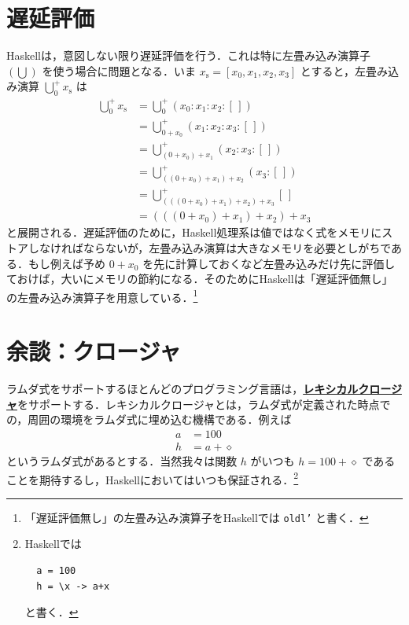 \documentclass[a5paper,twoside,fleqn,draft]{jsbook}
\newcommand{\programminglanguage}[1]{\textsf{#1}}
\newcommand{\haskell}{\programminglanguage{Haskell}}
\newcommand{\keyword}[1]{{\underline{\textbf{#1}}}}
\newcommand{\code}[1]{\texttt{#1}}
\newcommand{\mEmptyList}{{[\,]}}
\newcommand{\mAnonParam}{\diamond}
\DeclareMathOperator*{\mFold}{\bigcup}
\newcommand{\mList}[1]{{#1}_\mathrm{s}}
\begin{document}
\section{遅延評価}

\haskell は，意図しない限り遅延評価を行う．これは特に左畳み込み演算子 $(\mFold)$ を使う場合に問題となる．いま $\mList{x}=[x_0,x_1,x_2,x_3]$ とすると，左畳み込み演算 $\mFold^+_0\mList{x}$ は
\begin{align}
  \mFold^+_0\mList{x}
  &=\mFold^+_0{}(x_0:x_1:x_2:\mEmptyList)\\
  &=\mFold^+_{0+x_0}{}(x_1:x_2:x_3:\mEmptyList)\\
  &=\mFold^+_{(0+x_0)+x_1}{}(x_2:x_3:\mEmptyList)\\
  &=\mFold^+_{((0+x_0)+x_1)+x_2}{}(x_3:\mEmptyList)\\
  &=\mFold^+_{(((0+x_0)+x_1)+x_2)+x_3}{}\mEmptyList\\
  &=(((0+x_0)+x_1)+x_2)+x_3
\end{align}
と展開される．遅延評価のために，\haskell 処理系は値ではなく式をメモリにストアしなければならないが，左畳み込み演算は大きなメモリを必要としがちである．もし例えば予め $0+x_0$ を先に計算しておくなど左畳み込みだけ先に評価しておけば，大いにメモリの節約になる．そのために\haskell は「遅延評価無し」の左畳み込み演算子を用意している．\footnote{「遅延評価無し」の左畳み込み演算子を\haskell では \code{oldl'} と書く．}

%

\section{余談：クロージャ}

ラムダ式をサポートするほとんどのプログラミング言語は，\keyword{レキシカルクロージャ}をサポートする．レキシカルクロージャとは，ラムダ式が定義された時点での，周囲の環境をラムダ式に埋め込む機構である．例えば
\begin{align}
  a
  &=100\\
  h
  &=a+\mAnonParam
\end{align}
というラムダ式があるとする．当然我々は関数 $h$ がいつも $h=100+\mAnonParam$ であることを期待するし，\haskell においてはいつも保証される．\footnote{\haskell では
\begin{verbatim}
  a = 100
  h = \x -> a+x
\end{verbatim}
と書く．}
\end{document}
